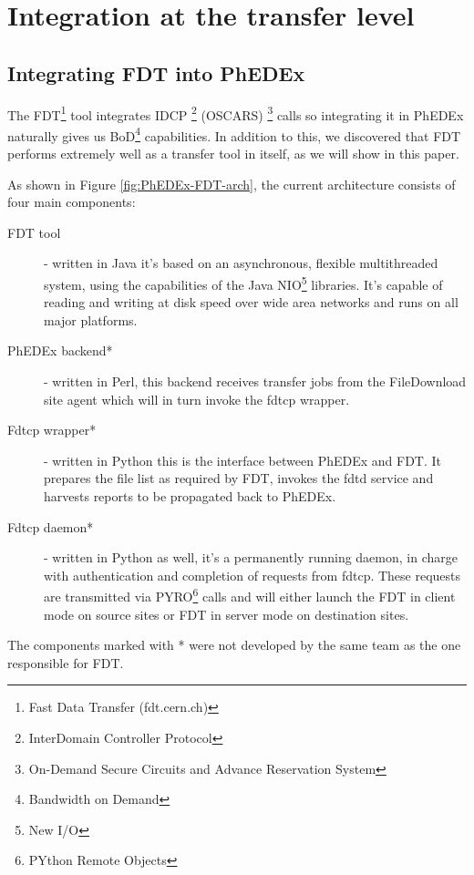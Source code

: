 \section{Integration at the transfer level}

\subsection{Integrating FDT into PhEDEx}
The FDT\footnote{Fast Data Transfer (fdt.cern.ch)} tool integrates IDCP
\footnote{InterDomain Controller Protocol} (OSCARS)
\footnote{On-Demand Secure Circuits and Advance Reservation System} calls so
integrating it in PhEDEx naturally gives us BoD\footnote{Bandwidth on Demand}
capabilities. In addition to this, we discovered that FDT performs extremely well
as a transfer tool in itself, as we will show in this paper.

As shown in Figure \ref{fig:PhEDEx-FDT-arch}, the current architecture consists
of four main components:
\begin{description}
	\item[FDT tool] - written in Java it's based on an asynchronous, flexible 
multithreaded system, using the capabilities of the Java NIO\footnote{New I/O} 
libraries. It's capable of reading and writing at disk speed over wide area 
networks and runs on all major platforms. 
	\item[PhEDEx backend*] - written in Perl, this backend
receives transfer jobs from the FileDownload site agent which will in turn 
invoke the fdtcp wrapper. 
	\item[Fdtcp wrapper*] - written in Python this is the 
interface between PhEDEx and FDT. It prepares the file list as required by FDT, 
invokes the fdtd service and harvests reports to be propagated back to PhEDEx.
	\item[Fdtcp daemon*] - written in Python as well, it's 
a permanently running daemon, in charge with authentication and completion of requests 
from fdtcp. These requests are transmitted via PYRO\footnote{PYthon Remote Objects} 
calls and will either launch the FDT in client mode on source sites or FDT in server 
mode on destination sites.
\end{description}

The components marked with * were not developed by the same team as the one responsible 
for FDT.

